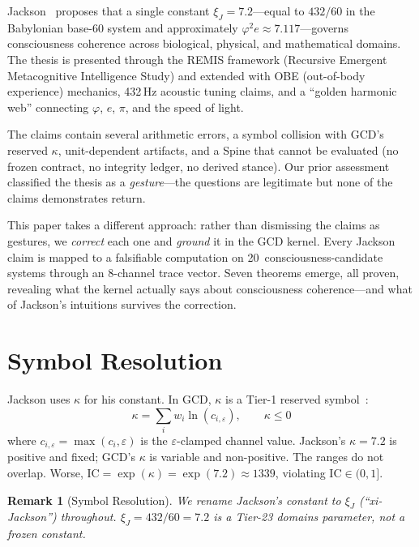 \documentclass[
  aps,
  prd,
  twocolumn,
  superscriptaddress,
  nofootinbib,
  floatfix
]{revtex4-2}
\newtheorem{remark}{Remark}
\newcommand{\eps}{\varepsilon}
\newcommand{\beq}{\begin{equation}}
\newcommand{\eeq}{\end{equation}}
\newcommand{\IC}{\mathrm{IC}}
\newcommand{\xiJ}{\xi_J}
\begin{document}
Jackson~\cite{jackson2026earth,jackson2026curved} proposes that a single
constant $\xiJ = 7.2$---equal to $432/60$ in the Babylonian base-60
system and approximately $\varphi^2 e \approx 7.117$---governs
consciousness coherence across biological, physical, and mathematical
domains.  The thesis is presented through the REMIS framework (Recursive
Emergent Metacognitive Intelligence Study) and extended with OBE (out-of-body
experience) mechanics, 432\,Hz acoustic tuning claims, and a ``golden
harmonic web'' connecting $\varphi$, $e$, $\pi$, and the speed of light.

The claims contain several arithmetic errors, a symbol collision with GCD's
reserved $\kappa$, unit-dependent artifacts, and a Spine that cannot be
evaluated (no frozen contract, no integrity ledger, no derived stance).
Our prior assessment classified the thesis as a \emph{gesture}---the
questions are legitimate but none of the claims demonstrates return.

This paper takes a different approach: rather than dismissing the claims as
gestures, we \emph{correct} each one and \emph{ground} it in the GCD
kernel.  Every Jackson claim is mapped to a falsifiable computation on
20~consciousness-candidate systems through an 8-channel trace vector.
Seven theorems emerge, all proven, revealing what the kernel actually says
about consciousness coherence---and what of Jackson's intuitions survives
the correction.

\section{Symbol Resolution}
\label{sec:symbols}

Jackson uses $\kappa$ for his constant.  In GCD, $\kappa$ is a Tier-1
reserved symbol~\cite{paulus2025umcp}:
\beq
  \kappa = \sum_i w_i \ln(c_{i,\eps}), \qquad \kappa \leq 0
\eeq
where $c_{i,\eps} = \max(c_i, \eps)$ is the $\eps$-clamped channel value.
Jackson's $\kappa = 7.2$ is positive and fixed; GCD's $\kappa$ is variable
and non-positive.  The ranges do not overlap.  Worse,
$\IC = \exp(\kappa) = \exp(7.2) \approx 1339$, violating $\IC \in (0,1]$.

\begin{remark}[Symbol Resolution]
We rename Jackson's constant to $\xiJ$ (``xi-Jackson'') throughout.
$\xiJ = 432/60 = 7.2$ is a Tier-23 domains parameter, not a frozen constant.
\end{remark}
\end{document}
